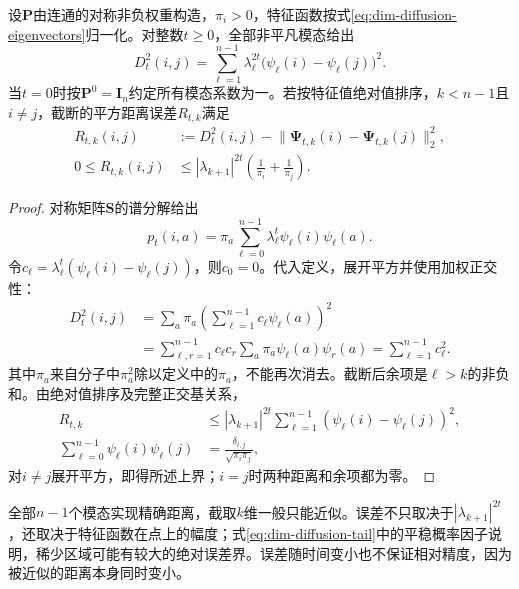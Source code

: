 \begin{theorem}[扩散距离的谱表示与截断界]
  \label{thm:dim-diffusion-isometry}
  设$\bm{P}$由连通的对称非负权重构造，$\pi_i>0$，特征函数按式\eqref{eq:dim-diffusion-eigenvectors}归一化。对整数$t\geq0$，全部非平凡模态给出
  \begin{equation}
    \label{eq:dim-diffusion-identity}
    D_t^2(i,j)
    =\sum_{\ell=1}^{n-1}\lambda_\ell^{2t}
      \bigl(\psi_\ell(i)-\psi_\ell(j)\bigr)^2.
  \end{equation}
  当$t=0$时按$\bm{P}^0=\bm{I}_n$约定所有模态系数为一。若按特征值绝对值排序，$k<n-1$且$i\ne j$，截断的平方距离误差$R_{t,k}$满足
  \begin{equation}
    \label{eq:dim-diffusion-tail}
    \begin{aligned}
      R_{t,k}(i,j)
        &:=D_t^2(i,j)
          -\lVert\bm{\Psi}_{t,k}(i)-\bm{\Psi}_{t,k}(j)\rVert_2^2,\\
      0\leq R_{t,k}(i,j)
        &\leq|\lambda_{k+1}|^{2t}
          \left(\frac1{\pi_i}+\frac1{\pi_j}\right).
    \end{aligned}
  \end{equation}
\end{theorem}
\begin{proof}
  对称矩阵$\bm{S}$的谱分解给出
  \[
    p_t(i,a)=\pi_a\sum_{\ell=0}^{n-1}
      \lambda_\ell^t\psi_\ell(i)\psi_\ell(a).
  \]
  令$c_\ell=\lambda_\ell^t(\psi_\ell(i)-\psi_\ell(j))$，则$c_0=0$。代入定义，展开平方并使用加权正交性：
  \[
    \begin{aligned}
      D_t^2(i,j)
        &=\sum_a\pi_a
          \left(\sum_{\ell=1}^{n-1}c_\ell\psi_\ell(a)\right)^2\\
        &=\sum_{\ell,r=1}^{n-1}c_\ell c_r
          \sum_a\pi_a\psi_\ell(a)\psi_r(a)
         =\sum_{\ell=1}^{n-1}c_\ell^2.
    \end{aligned}
  \]
  其中$\pi_a$来自分子中$\pi_a^2$除以定义中的$\pi_a$，不能再次消去。截断后余项是$\ell>k$的非负和。由绝对值排序及完整正交基关系，
  \[
    \begin{aligned}
      R_{t,k}
        &\leq|\lambda_{k+1}|^{2t}
          \sum_{\ell=1}^{n-1}
            (\psi_\ell(i)-\psi_\ell(j))^2,\\
      \sum_{\ell=0}^{n-1}\psi_\ell(i)\psi_\ell(j)
        &=\frac{\delta_{i,j}}{\sqrt{\pi_i\pi_j}},
    \end{aligned}
  \]
  对$i\ne j$展开平方，即得所述上界；$i=j$时两种距离和余项都为零。
\end{proof}

全部$n-1$个模态实现精确距离，截取$k$维一般只能近似。误差不只取决于$|\lambda_{k+1}|^{2t}$，还取决于特征函数在点上的幅度；式\eqref{eq:dim-diffusion-tail}中的平稳概率因子说明，稀少区域可能有较大的绝对误差界。误差随时间变小也不保证相对精度，因为被近似的距离本身同时变小。

